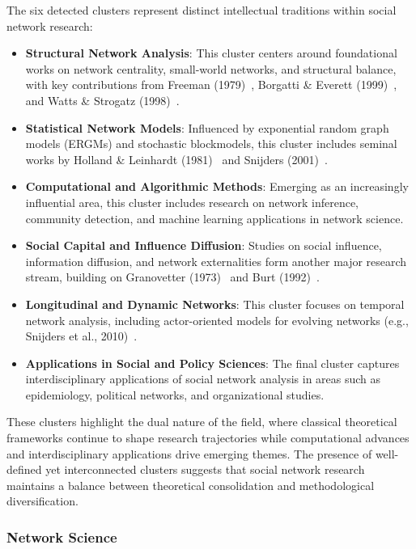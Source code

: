 \documentclass[twocolumn]{article}
\begin{document}
	The six detected clusters represent distinct intellectual traditions within social network research:
	
	\begin{itemize}
		\item \textbf{Structural Network Analysis}: This cluster centers around foundational works on network centrality, small-world networks, and structural balance, with key contributions from Freeman (1979)~\cite{Freeman1979}, Borgatti \& Everett (1999)~\cite{borgatti1999core}, and Watts \& Strogatz (1998)~\cite{Watts1998}.
		\item \textbf{Statistical Network Models}: Influenced by exponential random graph models (ERGMs) and stochastic blockmodels, this cluster includes seminal works by Holland \& Leinhardt (1981)~\cite{holland1981exponential} and Snijders (2001)~\cite{snijders2001statistical}.
		\item \textbf{Computational and Algorithmic Methods}: Emerging as an increasingly influential area, this cluster includes research on network inference, community detection, and machine learning applications in network science.
		\item \textbf{Social Capital and Influence Diffusion}: Studies on social influence, information diffusion, and network externalities form another major research stream, building on Granovetter (1973)~\cite{granovetter1973strength} and Burt (1992)~\cite{Burt1992}.
		\item \textbf{Longitudinal and Dynamic Networks}: This cluster focuses on temporal network analysis, including actor-oriented models for evolving networks (e.g., Snijders et al., 2010)~\cite{snijders2010stochastic}.
		\item \textbf{Applications in Social and Policy Sciences}: The final cluster captures interdisciplinary applications of social network analysis in areas such as epidemiology, political networks, and organizational studies.
	\end{itemize}
	
	
	These clusters highlight the dual nature of the field, where classical theoretical frameworks continue to shape research trajectories while computational advances and interdisciplinary applications drive emerging themes. The presence of well-defined yet interconnected clusters suggests that social network research maintains a balance between theoretical consolidation and methodological diversification.
	
	\subsubsection*{Network Science}
		
\end{document}
